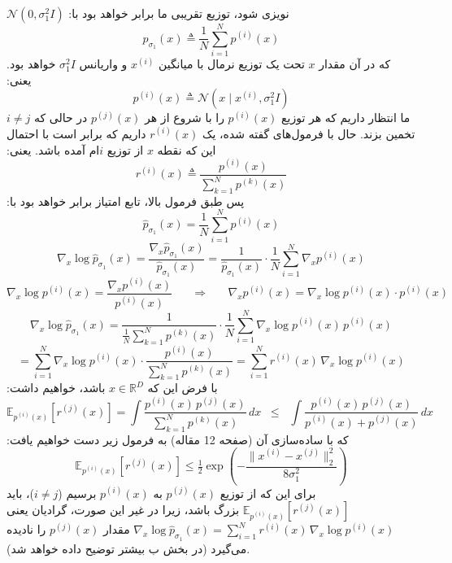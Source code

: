 \documentclass[12pt]{article}
\begin{document}
\begin{enumerate}
\begin{enumerate}
{        $\mathcal{N}(0, \sigma_1^2 I)$ 
        نویزی شود، توزیع تقریبی ما برابر خواهد بود با:
        $$
        p_{\sigma_1}(x) \triangleq \frac{1}{N} \sum_{i=1}^{N} p^{(i)}(x)
        $$
        که در آن مقدار $x$ تحت یک توزیع نرمال با میانگین $x^{(i)}$ و واریانس $\sigma_1^2 I$ خواهد بود. یعنی:
        $$
        p^{(i)}(x) \triangleq \mathcal{N}(x \mid x^{(i)}, \sigma_1^2 I)
        $$
        ما انتظار داریم که  هر توزیع $p^{(i)}(x)$ را با شروع از هر $p^{(j)}(x)$ در حالی که $i \neq j$ تخمین بزند.  
        حال با فرمول‌های گفته شده، یک $r^{(i)}(x)$ داریم که برابر است با احتمال این که نقطه $x$ از توزیع $i$ام آمده باشد. یعنی:
        $$
        r^{(i)}(x) \triangleq \frac{p^{(i)}(x)}{\sum_{k=1}^{N} p^{(k)}(x)}
        $$
        پس طبق فرمول بالا، تابع امتیاز برابر خواهد بود با:
        $$
        \hat{p}_{\sigma_1}(x) = \frac{1}{N} \sum_{i=1}^{N} p^{(i)}(x)
        $$
        $$
        \nabla_x \log \hat{p}_{\sigma_1}(x) 
        = \frac{\nabla_x \hat{p}_{\sigma_1}(x)}{\hat{p}_{\sigma_1}(x)} 
        = \frac{1}{\hat{p}_{\sigma_1}(x)} \cdot \frac{1}{N} \sum_{i=1}^{N} \nabla_x p^{(i)}(x)
        $$
        $$
        \nabla_x \log p^{(i)}(x) = \frac{\nabla_x p^{(i)}(x)}{p^{(i)}(x)}
        \;\;\;\;\;\;\Rightarrow\;\;\;\;\;\;
        \nabla_x p^{(i)}(x) = \nabla_x \log p^{(i)}(x) \cdot p^{(i)}(x)
        $$
        $$
        \nabla_x \log \hat{p}_{\sigma_1}(x) 
        = \frac{1}{\frac{1}{N} \sum_{k=1}^{N} p^{(k)}(x)} \cdot \frac{1}{N} \sum_{i=1}^{N} \nabla_x \log p^{(i)}(x) \, p^{(i)}(x)
        $$
        $$
        = \sum_{i=1}^{N} \nabla_x \log p^{(i)}(x) \cdot \frac{p^{(i)}(x)}{\sum_{k=1}^{N} p^{(k)}(x)}
        = \sum_{i=1}^{N} r^{(i)}(x) \, \nabla_x \log p^{(i)}(x)
        $$
        با فرض این که $x \in \mathbb{R}^D$ باشد، خواهیم داشت:
        $$
        \mathbb{E}_{p^{(i)}(x)} [r^{(j)}(x)] 
        = \int \frac{p^{(i)}(x) \, p^{(j)}(x)}{\sum_{k=1}^{N} p^{(k)}(x)} \, dx 
        \;\;\leq\;\;
        \int \frac{p^{(i)}(x) \, p^{(j)}(x)}{p^{(i)}(x) + p^{(j)}(x)} \, dx
        $$
        که با ساده‌سازی آن (صفحه 12 مقاله) به فرمول زیر دست خواهیم یافت:
        $$
        \mathbb{E}_{p^{(i)}(x)} [r^{(j)}(x)] \leq \tfrac{1}{2} \exp\!\left(-\frac{\lVert x^{(i)} - x^{(j)} \rVert_2^2}{8 \sigma_1^2}\right)
        $$
        برای این که از توزیع $p^{(j)}(x)$ به $p^{(i)}(x)$ برسیم ($i \neq j$)، باید 
        $\mathbb{E}_{p^{(i)}(x)} [r^{(j)}(x)]$ 
        بزرگ باشد، زیرا در غیر این صورت، گرادیان یعنی $\nabla_x \log \hat{p}_{\sigma_1}(x) 
        = \sum_{i=1}^{N} r^{(i)}(x) \, \nabla_x \log p^{(i)}(x)$
        مقدار $p^{(j)}(x)$ را نادیده می‌گیرد (در بخش ب بیشتر توضیح داده خواهد شد).  
}
\end{enumerate}
\end{enumerate}
\end{document}
